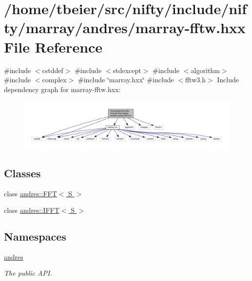 \hypertarget{marray-fftw_8hxx}{}\section{/home/tbeier/src/nifty/include/nifty/marray/andres/marray-\/fftw.hxx File Reference}
\label{marray-fftw_8hxx}
{\ttfamily \#include $<$cstddef$>$}\newline
{\ttfamily \#include $<$stdexcept$>$}\newline
{\ttfamily \#include $<$algorithm$>$}\newline
{\ttfamily \#include $<$complex$>$}\newline
{\ttfamily \#include \char`\"{}marray.\+hxx\char`\"{}}\newline
{\ttfamily \#include $<$fftw3.\+h$>$}\newline
Include dependency graph for marray-\/fftw.hxx\+:
\nopagebreak
\begin{figure}[H]
\begin{center}
\leavevmode
\includegraphics[width=350pt]{marray-fftw_8hxx__incl}
\end{center}
\end{figure}
\subsection*{Classes}
\begin{DoxyCompactItemize}
\item 
class \hyperlink{classandres_1_1FFT}{andres\+::\+F\+F\+T$<$ S $>$}
\item 
class \hyperlink{classandres_1_1IFFT}{andres\+::\+I\+F\+F\+T$<$ S $>$}
\end{DoxyCompactItemize}
\subsection*{Namespaces}
\begin{DoxyCompactItemize}
\item 
 \hyperlink{namespaceandres}{andres}
\begin{DoxyCompactList}\small\item\em The public A\+PI. \end{DoxyCompactList}\end{DoxyCompactItemize}
